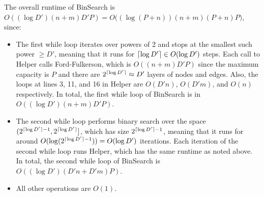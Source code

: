 \documentclass[11pt]{article}
\DeclarePairedDelimiter{\ceil}{\lceil}{\rceil}
\begin{document}

The overall runtime of BinSearch is $O((\log D')(n+m)D'P)=O \Big( (\log(P+n))(n+m)(P+n)P \Big)$, since:

\begin{itemize}
    \item The first while loop iterates over powers of 2 and stops at the smallest such power $\geq D'$, meaning that it runs for $\ceil{\log D'}\in O(\log D')$ steps. Each call to Helper calls Ford-Fulkerson, which is $O((n+m)D'P)$ since the maximum capacity is $P$ and there are $2^{\ceil{\log D'}}\approx D'$ layers of nodes and edges. Also, the loops at lines 3, 11, and 16 in Helper are $O(D'n)$, $O(D'm)$, and $O(n)$ respectively. In total, the first while loop of BinSearch is in $O((\log D')(n+m)D'P)$.
    \item The second while loop performs binary search over the space $(2^{\ceil{\log D'}-1}, 2^{\ceil{\log D'}}]$, which has size $2^{\ceil{\log D'}-1}$, meaning that it runs for around $O(\log(2^{\ceil{\log D'}-1}))=O(\log D')$ iterations. Each iteration of the second while loop runs Helper, which has the same runtime as noted above. In total, the second while loop of BinSearch is $O((\log D')(D'n+D'm)P)$.
    \item All other operations are $O(1)$.\\
\end{itemize}
\end{document}
